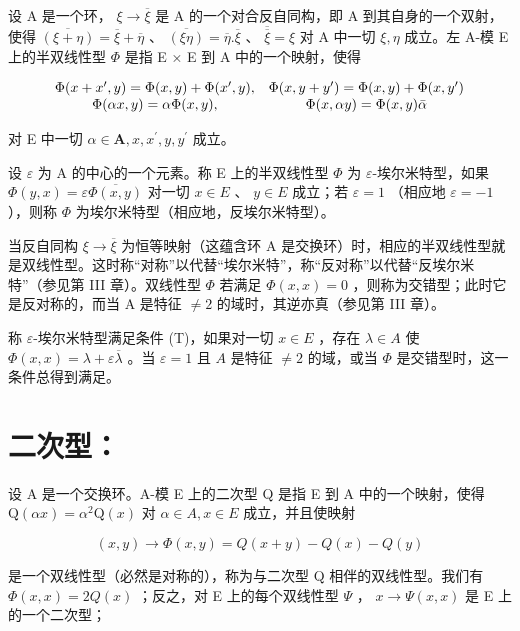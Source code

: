 设 A 是一个环， \(\xi \to \overline{\xi}\) 是 A 的一个对合反自同构，即 A 到其自身的一个双射，使得 \(\overline{(\xi + \eta)} = \overline{\xi} + \overline{\eta}\) 、 \(\overline{(\xi\eta)} = \overline{\eta} . \overline{\xi}\) 、 \(\overline{\overline{\xi}} = \xi\) 对 A 中一切 \(\xi, \eta\) 成立。左 A-模 E 上的半双线性型 \(\Phi\) 是指 E × E 到 A 中的一个映射，使得

\[
\begin{array}{c c} \Phi (x + x ^ {\prime}, y) = \Phi (x, y) + \Phi (x ^ {\prime}, y), & \Phi (x, y + y ^ {\prime}) = \Phi (x, y) + \Phi (x, y ^ {\prime}) \\ \Phi (\alpha x, y) = \alpha \Phi (x, y), & \Phi (x, \alpha y) = \Phi (x, y) \bar {\alpha} \end{array}
\]

对 E 中一切 \(\alpha\in\mathbf{A},x,x^{\prime},y,y^{\prime}\) 成立。

设 \(\varepsilon\) 为 A 的中心的一个元素。称 E 上的半双线性型 \(\Phi\) 为 \(\varepsilon\)-埃尔米特型，如果 \(\Phi(y, x) = \varepsilon \overline{\Phi(x, y)}\) 对一切 \(x \in E\) 、 \(y \in E\) 成立；若 \(\varepsilon = 1\) （相应地 \(\varepsilon = -1\) ），则称 \(\Phi\) 为埃尔米特型（相应地，反埃尔米特型）。

当反自同构 \(\xi\to\overline{\xi}\) 为恒等映射（这蕴含环 A 是交换环）时，相应的半双线性型就是双线性型。这时称“对称”以代替“埃尔米特”，称“反对称”以代替“反埃尔米特”（参见第 III 章）。双线性型 \(\Phi\) 若满足 \(\Phi(x,x)=0\) ，则称为交错型；此时它是反对称的，而当 A 是特征 \(\neq2\) 的域时，其逆亦真（参见第 III 章）。

称 \(\varepsilon\)-埃尔米特型满足条件 (T)，如果对一切 \(x \in E\) ，存在 \(\lambda \in A\) 使 \(\Phi(x, x) = \lambda + \varepsilon \overline{\lambda}\) 。当 \(\varepsilon = 1\) 且 \(A\) 是特征 \(\neq 2\) 的域，或当 \(\Phi\) 是交错型时，这一条件总得到满足。

\section*{二次型：}

设 A 是一个交换环。A-模 E 上的二次型 Q 是指 E 到 A 中的一个映射，使得 \(\mathrm{Q}(\alpha x) = \alpha^{2}\mathrm{Q}(x)\) 对 \(\alpha \in A, x \in E\) 成立，并且使映射

\[
(x, y) \rightarrow \Phi (x, y) = Q (x + y) - Q (x) - Q (y)
\]

是一个双线性型（必然是对称的），称为与二次型 Q 相伴的双线性型。我们有 \(\Phi(x, x) = 2Q(x)\) ；反之，对 E 上的每个双线性型 \(\Psi\) ， \(x \to \Psi(x, x)\) 是 E 上的一个二次型；

